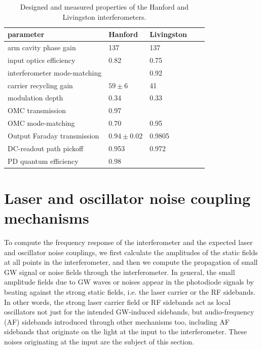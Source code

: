 \begin{table}
\centering
\begin{tabular}{l l l l l}
\hline 
\textbf{parameter}          &\textbf{Hanford}&\textbf{Livingston}  \\
\hline
arm cavity phase gain       & 137            & 137         \\
input optics efficiency     & 0.82           & 0.75        \\
interferometer mode-matching&                & 0.92        \\
carrier recycling gain      & $59\pm6$       & 41          \\
modulation depth            & 0.34           & 0.33        \\
OMC transmission            & 0.97           &             \\
OMC mode-matching           & 0.70           & 0.95        \\
Output Faraday transmission & $0.94\pm0.02$  & 0.9805      \\
DC-readout path pickoff     & 0.953          & 0.972       \\
PD quantum efficiency       & 0.98           &             \\
\hline
\end{tabular}
\caption[Interferometer properties (designed and measured)]{Designed and measured properties of the Hanford and Livingston interferometers.}
\label{tab:ifo-properties}
\end{table}


\section{Laser and oscillator noise coupling mechanisms}


To compute the frequency response of the interferometer and the
expected laser and oscillator noise couplings, we first calculate the
amplitudes of the static fields at all points in the interferometer,
and then we compute the propagation of small GW signal or noise fields
through the interferometer.  In general, the small amplitude fields
due to GW waves or noises appear in the photodiode signals by beating
against the strong static fields, i.e. the laser carrier or the RF
sidebands.  In other words, the strong laser carrier field or RF
sidebands act as local oscillators not just for the intended
GW-induced sidebands, but audio-frequency (AF) sidebands introduced
through other mechanisms too, including AF sidebands that originate on
the light at the input to the interferometer.  These noises originating
at the input are the subject of this section.


